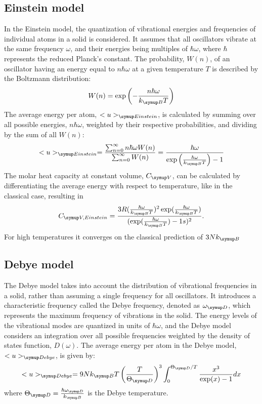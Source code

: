 \subsection{Einstein model}
In the Einstein model, the quantization of vibrational energies and frequencies of individual atoms in a solid is considered. It assumes 
that all oscillators vibrate at the same frequency $\omega$, and their energies being multiples of $\hbar\omega$, where 
$\hbar$ represents the reduced Planck's constant. The probability, $W(n)$, of an oscillator having an energy equal to $n\hbar\omega$ 
at a given temperature $T$ is described by the Boltzmann distribution:
\begin{equation*}
W(n) = \exp\left(-\frac{n\hbar\omega}{k\idx{B}T}\right)
\end{equation*}
The average energy per atom, $<u>\idx{Einstein}$, is calculated by summing over all possible energies, $n\hbar\omega$, weighted by their 
respective probabilities, and dividing by the sum of all $W(n)$:
\begin{equation*}
<u>\idx{Einstein} = \frac{\sum_{n=0}^{\infty}n\hbar\omega W(n)}{\sum_{n=0}^{\infty}W(n)} = \frac{\hbar\omega}{\exp\left(\frac{\hbar\omega}{k\idx{B}T}\right)-1} 
\end{equation*}
The molar heat capacity at constant volume, $C\idx{V}$, can be calculated by differentiating the average energy with respect to temperature, 
like in the classical case, resulting in 
\begin{equation*}
C\idx{V, Einstein} = \frac{3R(\frac{\hbar\omega}{k\idx{B}T})^{2}\exp(\frac{\hbar\omega}{k\idx{B}T})}{(\exp(\frac{\hbar\omega}{k\idx{B}T})-1s)^{2}}.
\end{equation*}
For high temperatures it converges on the classical prediction of $3Nk\idx{B}$
\subsection{Debye model}
The Debye model takes into account the distribution of vibrational frequencies in a solid, rather than assuming a single frequency for all 
oscillators. It introduces a characteristic frequency called the Debye frequency, denoted as $\omega\idx{D}$, which represents the maximum 
frequency of vibrations in the solid. The energy levels of the vibrational modes are quantized in units of $\hbar\omega$, and the Debye model 
considers an integration over all possible frequencies weighted by the density of states function, $D(\omega)$. The average energy per atom 
in the Debye model, $<u>\idx{Debye}$, is given by:
\begin{equation*}
 <u>\idx{Debye} = 9Nk\idx{B}T \left(\frac{T}{\Theta\idx{D}}\right)^3\int_{0}^{\Theta\idx{D}/T} \frac{x^3}{\exp(x)-1} dx 
\end{equation*}
where $\Theta\idx{D} = \frac{\hbar\omega\idx{D}}{k\idx{B}}$ is the Debye temperature.


